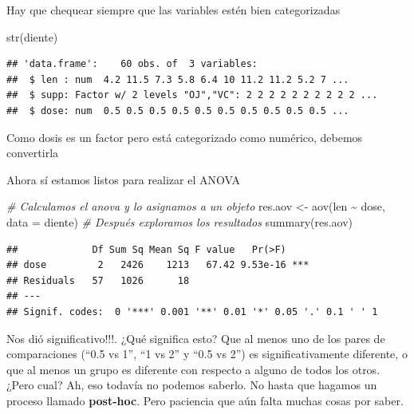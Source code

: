 \documentclass[
]{book}
\newenvironment{Shaded}{\begin{snugshade}}{\end{snugshade}}
\newcommand{\AttributeTok}[1]{\textcolor[rgb]{0.77,0.63,0.00}{#1}}
\newcommand{\CommentTok}[1]{\textcolor[rgb]{0.56,0.35,0.01}{\textit{#1}}}
\newcommand{\FunctionTok}[1]{\textcolor[rgb]{0.00,0.00,0.00}{#1}}
\newcommand{\NormalTok}[1]{#1}
\newcommand{\OtherTok}[1]{\textcolor[rgb]{0.56,0.35,0.01}{#1}}
\newcommand{\SpecialCharTok}[1]{\textcolor[rgb]{0.00,0.00,0.00}{#1}}
\begin{document}
Hay que chequear siempre que las variables estén bien categorizadas

\begin{Shaded}
\begin{Highlighting}[]
\FunctionTok{str}\NormalTok{(diente) }
\end{Highlighting}
\end{Shaded}

\begin{verbatim}
## 'data.frame':    60 obs. of  3 variables:
##  $ len : num  4.2 11.5 7.3 5.8 6.4 10 11.2 11.2 5.2 7 ...
##  $ supp: Factor w/ 2 levels "OJ","VC": 2 2 2 2 2 2 2 2 2 2 ...
##  $ dose: num  0.5 0.5 0.5 0.5 0.5 0.5 0.5 0.5 0.5 0.5 ...
\end{verbatim}

Como dosis es un factor pero está categorizado como numérico, debemos convertirla

\begin{Shaded}
\end{Shaded}

Ahora sí estamos listos para realizar el ANOVA

\begin{Shaded}
\begin{Highlighting}[]
\CommentTok{\# Calculamos el anova y lo asignamos a un objeto}
\NormalTok{res.aov }\OtherTok{\textless{}{-}} \FunctionTok{aov}\NormalTok{(len }\SpecialCharTok{\textasciitilde{}}\NormalTok{ dose, }\AttributeTok{data =}\NormalTok{ diente)}
\CommentTok{\# Después exploramos los resultados}
\FunctionTok{summary}\NormalTok{(res.aov)}
\end{Highlighting}
\end{Shaded}

\begin{verbatim}
##             Df Sum Sq Mean Sq F value   Pr(>F)    
## dose         2   2426    1213   67.42 9.53e-16 ***
## Residuals   57   1026      18                     
## ---
## Signif. codes:  0 '***' 0.001 '**' 0.01 '*' 0.05 '.' 0.1 ' ' 1
\end{verbatim}

Nos dió significativo!!!. ¿Qué significa esto? Que al menos uno de los pares de comparaciones (``0.5 vs 1'', ``1 vs 2'' y ``0.5 vs 2'') es significativamente diferente, o que al menos un grupo es diferente con respecto a alguno de todos los otros. ¿Pero cual? Ah, eso todavía no podemos saberlo. No hasta que hagamos un proceso llamado \textbf{post-hoc}. Pero paciencia que aún falta muchas cosas por saber.
\end{document}
